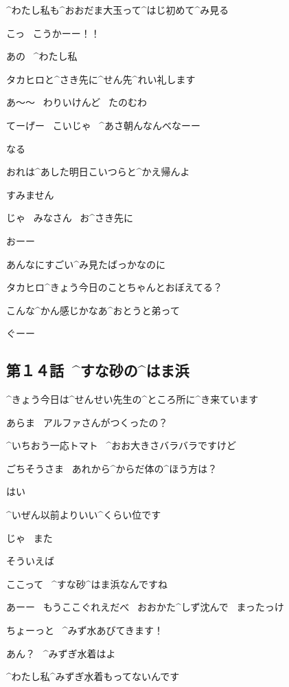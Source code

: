 \page
\Alpha ^{わたし}{私}も^{おおだま}{大玉}って^{はじ}{初}めて^{み}{見}る

\page[92]
\Alpha こっ
\ こうかーー！！

\page[96]
\Alpha あの
\ ^{わたし}{私}

\Alpha タカヒロと^{さき}{先}に^{せん}{先}^{れい}{礼}します

\page
\Ojisan あ〜〜
\ わりいけんど
\ たのむわ

\Ojisan てーげー
\ こいじゃ
\ ^{あさ}{朝}んなんべなーー

\Ojisan なる

\Ojisan おれは^{あした}{明日}こいつらと^{かえ}{帰}んよ

\Alpha すみません

\Alpha じゃ
\ みなさん
\ お^{さき}{先}に

\Person おーー

\page
\Alpha あんなにすごい^{み}{見}たばっかなのに

\page
\Alpha タカヒロ^{きょう}{今日}のことちゃんとおぼえてる？

\page
\Alpha こんな^{かん}{感}じかなあ^{おとうと}{弟}って

\Alpha ぐーー


\subsection{第１４話\ ^{すな}{砂}の^{はま}{浜}}

\page[102]
\Alpha ^{きょう}{今日}は^{せんせい}{先生}の^{ところ}{所}に^{き}{来}ています

\Sensei あらま
\ アルファさんがつくったの？

\Alpha ^{いちおう}{一応}トマト
\ ^{おお}{大}きさバラバラですけど

\Sensei ごちそうさま
\ あれから^{からだ}{体}の^{ほう}{方}は？

\Alpha はい

\Alpha ^{いぜん}{以前}よりいい^{くらい}{位}です

\Alpha じゃ
\ また

\page
\Alpha そういえば

\Alpha ここって
\ ^{すな}{砂}^{はま}{浜}なんですね

\Ojisan あーー
\ もうここぐれえだべ
\ おおかた^{しず}{沈}んで
\ まったっけ

\Alpha ちょーっと
\ ^{みず}{水}あびてきます！

\Ojisan あん？
\ ^{みずぎ}{水着}はよ

\Alpha ^{わたし}{私}^{みずぎ}{水着}もってないんです

